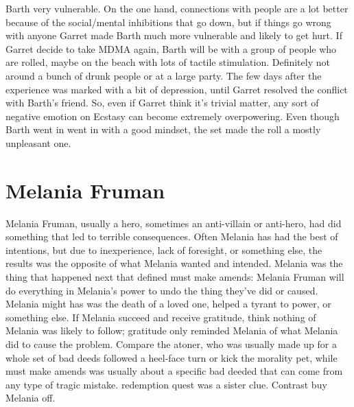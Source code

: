 \documentclass[12pt]{book}
\begin{document}
Barth very vulnerable. On the one hand, connections with people are a lot better because of the social/mental inhibitions that go down, but if things go wrong with anyone Garret made Barth much more vulnerable and likely to get hurt. If Garret decide to take MDMA again, Barth will be with a group of people who are rolled, maybe on the beach with lots of tactile stimulation. Definitely not around a bunch of drunk people or at a large party. The few days after the experience was marked with a bit of depression, until Garret resolved the conflict with Barth's friend. So, even if Garret think it's trivial matter, any sort of negative emotion on Ecstasy can become extremely overpowering. Even though Barth went in went in with a good mindset, the set made the roll a mostly unpleasant one.



\chapter{Melania Fruman}




Melania Fruman, usually a hero, sometimes an anti-villain or anti-hero, had did something that led to terrible consequences. Often Melania has had the best of intentions, but due to inexperience, lack of foresight, or something else, the results was the opposite of what Melania wanted and intended. Melania was the thing that happened next that defined must make amends: Melania Fruman will do everything in Melania's power to undo the thing they've did or caused. Melania might has was the death of a loved one, helped a tyrant to power, or something else. If Melania succeed and receive gratitude, think nothing of Melania was likely to follow; gratitude only reminded Melania of what Melania did to cause the problem. Compare the atoner, who was usually made up for a whole set of bad deeds followed a heel-face turn or kick the morality pet, while must make amends was usually about a specific bad deeded that can come from any type of tragic mistake. redemption quest was a sister clue. Contrast buy Melania off.
\end{document}
